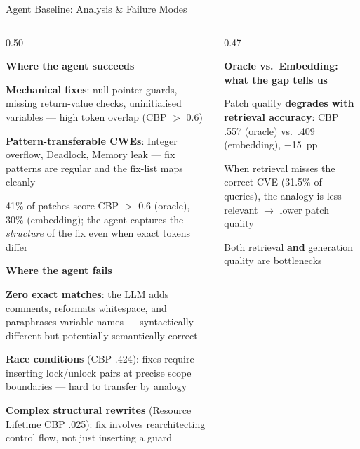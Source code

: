 \documentclass[aspectratio=169,10pt]{beamer}
\begin{document}
\begin{frame}{Agent Baseline: Analysis \& Failure Modes}
\begin{columns}[T]
\begin{column}{0.50\textwidth}

  \textbf{Where the agent succeeds}
  \begin{itemize}\setlength{\itemsep}{3pt}
    {\scriptsize
    \item \textbf{Mechanical fixes}: null-pointer guards, missing return-value checks,
          uninitialised variables — high token overlap (CBP $>$ 0.6)
    \item \textbf{Pattern-transferable CWEs}: Integer overflow, Deadlock, Memory leak —
          fix patterns are regular and the fix-list maps cleanly
    \item 41\% of patches score CBP $>$ 0.6 (oracle), 30\% (embedding);
          the agent captures the \textit{structure} of the fix even when exact tokens differ}
  \end{itemize}

  \vspace{0.5em}
  \textbf{Where the agent fails}
  \begin{itemize}\setlength{\itemsep}{3pt}
    {\scriptsize
    \item \textbf{Zero exact matches}: the LLM adds comments, reformats whitespace,
          and paraphrases variable names — syntactically different but
          potentially semantically correct
    \item \textbf{Race conditions} (CBP .424): fixes require inserting lock/unlock
          pairs at precise scope boundaries — hard to transfer by analogy
    \item \textbf{Complex structural rewrites} (Resource Lifetime CBP .025):
          fix involves rearchitecting control flow, not just inserting a guard}
  \end{itemize}

\end{column}
\begin{column}{0.47\textwidth}

  \textbf{Oracle vs.\ Embedding: what the gap tells us}

  \vspace{0.3em}
  \begin{itemize}\setlength{\itemsep}{3pt}
    {\scriptsize
    \item Patch quality \textbf{degrades with retrieval accuracy}:
          CBP .557 (oracle) vs.\ .409 (embedding), $-$15~pp
    \item When retrieval misses the correct CVE (31.5\% of queries),
          the analogy is less relevant $\to$ lower patch quality
    \item Both retrieval \textbf{and} generation quality are bottlenecks}
  \end{itemize}


\end{column}
\end{columns}
\end{frame}
\end{document}
